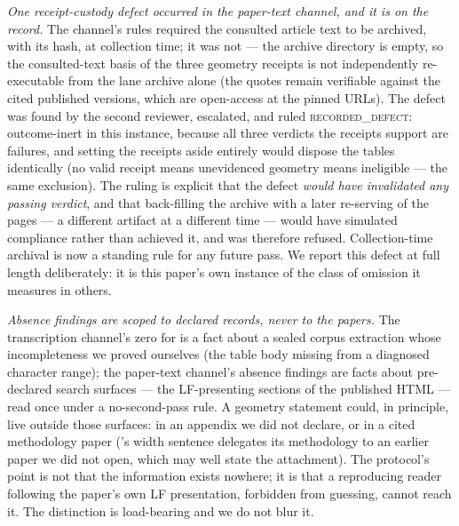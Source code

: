 \documentclass[twocolumn]{aastex702}
\begin{document}
\emph{One receipt-custody defect occurred in the paper-text channel, and it is on the
record.} The channel's rules required the consulted article text to be archived, with
its hash, at collection time; it was not --- the archive directory is empty, so the
consulted-text basis of the three geometry receipts is not independently re-executable
from the lane archive alone (the quotes remain verifiable against the cited published
versions, which are open-access at the pinned URLs). The defect was found by the second
reviewer, escalated, and ruled \textsc{recorded\_defect}: outcome-inert in this
instance, because all three verdicts the receipts support are failures, and setting the
receipts aside entirely would dispose the tables identically (no valid receipt means
unevidenced geometry means ineligible --- the same exclusion). The ruling is explicit
that the defect \emph{would have invalidated any passing verdict}, and that back-filling
the archive with a later re-serving of the pages --- a different artifact at a different
time --- would have simulated compliance rather than achieved it, and was therefore
refused. Collection-time archival is now a standing rule for any future pass. We report
this defect at full length deliberately: it is this paper's own instance of the class of
omission it measures in others.

\emph{Absence findings are scoped to declared records, never to the papers.} The
transcription channel's zero for \citet{whitler25} is a fact about a sealed corpus
extraction whose incompleteness we proved ourselves (the table body missing from a
diagnosed character range); the paper-text channel's absence findings are facts about
pre-declared search surfaces --- the LF-presenting sections of the published HTML ---
read once under a no-second-pass rule. A geometry statement could, in principle, live
outside those surfaces: in an appendix we did not declare, or in a cited methodology
paper (\citealt{finkelstein24}'s width sentence delegates its methodology to an earlier
paper we did not open, which may well state the attachment). The protocol's point is
not that the information exists nowhere; it is that a reproducing reader following the
paper's own LF presentation, forbidden from guessing, cannot reach it. The distinction
is load-bearing and we do not blur it.
\end{document}
